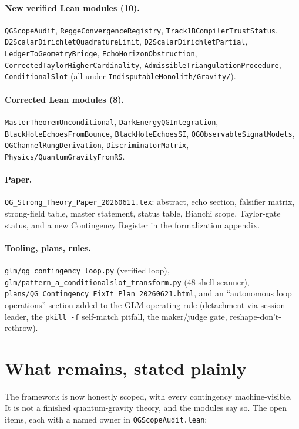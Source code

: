 \documentclass[11pt,letterpaper]{article}
\newcommand{\lmod}[1]{\texttt{#1}}
\begin{document}
\paragraph{New verified Lean modules (10).}
\lmod{QGScopeAudit}, \lmod{ReggeConvergenceRegistry}, \lmod{Track1BCompilerTrustStatus},
\lmod{D2ScalarDirichletQuadratureLimit}, \lmod{D2ScalarDirichletPartial},
\lmod{LedgerToGeometryBridge}, \lmod{EchoHorizonObstruction},
\lmod{CorrectedTaylorHigherCardinality}, \lmod{AdmissibleTriangulationProcedure},
\lmod{ConditionalSlot} (all under \lmod{IndisputableMonolith/Gravity/}).

\paragraph{Corrected Lean modules (8).}
\lmod{MasterTheoremUnconditional}, \lmod{DarkEnergyQGIntegration},
\lmod{BlackHoleEchoesFromBounce}, \lmod{BlackHoleEchoesSI},
\lmod{QGObservableSignalModels}, \lmod{QGChannelRungDerivation},
\lmod{DiscriminatorMatrix}, \lmod{Physics/QuantumGravityFromRS}.

\paragraph{Paper.}
\lmod{QG\_Strong\_Theory\_Paper\_20260611.tex}: abstract, echo section, falsifier
matrix, strong-field table, master statement, status table, Bianchi scope,
Taylor-gate status, and a new Contingency Register in the formalization appendix.

\paragraph{Tooling, plans, rules.}
\lmod{glm/qg\_contingency\_loop.py} (verified loop),
\lmod{glm/pattern\_a\_conditionalslot\_transform.py} (48-shell scanner),
\lmod{plans/QG\_Contingency\_FixIt\_Plan\_20260621.html}, and an
``autonomous loop operations'' section added to the GLM operating rule
(detachment via session leader, the \texttt{pkill -f} self-match pitfall, the
maker/judge gate, reshape-don't-rethrow).

\section{What remains, stated plainly}
\label{sec:remains}

The framework is now honestly scoped, with every contingency machine-visible. It
is not a finished quantum-gravity theory, and the modules say so. The open items,
each with a named owner in \lmod{QGScopeAudit.lean}:
\end{document}
